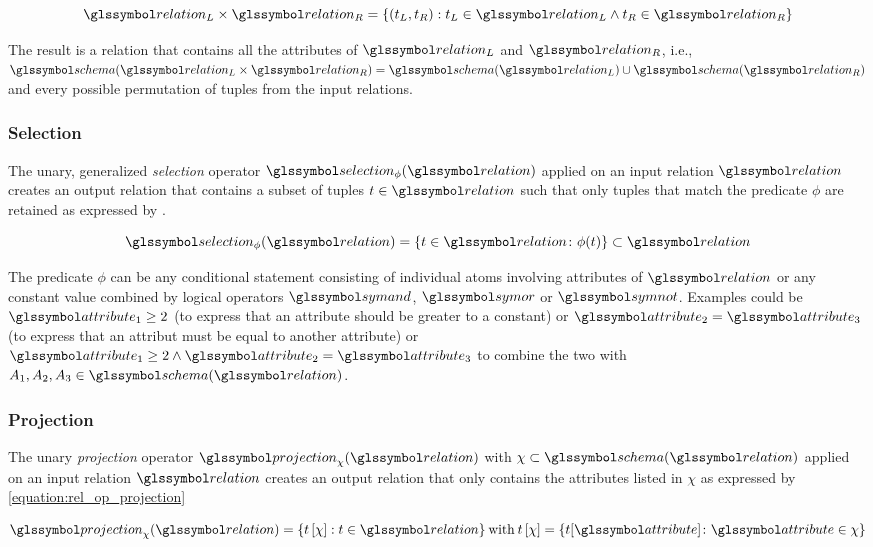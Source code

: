 \begin{equation}
    \label{equation:rel_op_cartesian}
    \relation_L \times \relation_R = \{ (t_L, t_R) : t_L \in \relation_L \wedge t_R \in \relation_R \}
\end{equation}

The result is a relation that contains all the attributes of $\relation_L$ and $\relation_R$, i.e., $\schema(\relation_L \times \relation_R) = \schema(\relation_L) \cup \schema(\relation_R)$ and every possible permutation of tuples from the input relations.


\subsubsection{Selection}

The unary, generalized \emph{selection} operator $\selection_{\phi}(\relation)$ applied on an input relation $\relation$ creates an output relation that contains a subset of tuples $t \in \relation$ such that only tuples that match the predicate $\phi$ are retained as expressed by .

\begin{equation}
    \label{equation:rel_op_selection}
    \selection_{\phi}(\relation) = \{ t \in \relation \colon \phi(t) \} \subset \relation
\end{equation}

The predicate $\phi$ can be any conditional statement consisting of individual atoms involving attributes of $\relation$ or any constant value combined by logical operators $\symand$, $\symor$ or $\symnot$. Examples could be $\attribute_1 \geq 2$ (to express that an attribute should be greater to a constant) or $\attribute_2 = \attribute_3$ (to express that an attribut must be equal to another attribute) or $\attribute_1 \geq 2 \wedge \attribute_2 = \attribute_3$ to combine the two with $A_1,A_2,A_3 \in \schema(\relation)$.

\subsubsection{Projection}
The unary \emph{projection} operator $\projection_{\chi}(\relation)$ with $\chi \subset \schema(\relation)$ applied on an input relation $\relation$ creates an output relation that only contains the attributes listed in $\chi$ as expressed by \cref{equation:rel_op_projection}

\begin{equation}
    \label{equation:rel_op_projection}
    \projection_{\chi}(\relation) = \{ t\left[ \chi \right] : t \in \relation \} \: \textrm{with} \: t\left[ \chi \right] = \{ t[\attribute] \colon \attribute \in \chi \}
\end{equation}

